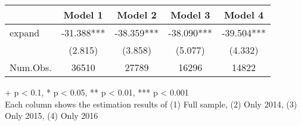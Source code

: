 \setlength{\LTpost}{0mm}
\begin{longtable}{lcccc}
\toprule
  & Model 1 & Model 2 & Model 3 & Model 4 \\ 
\midrule
expand & -31.388*** & -38.359*** & -38.090*** & -39.504*** \\ 
 & (2.815) & (3.858) & (5.077) & (4.332) \\ 
Num.Obs. & 36510 & 27789 & 16296 & 14822 \\ 
\bottomrule
\end{longtable}
\begin{minipage}{\linewidth}
+ p < 0.1, * p < 0.05, ** p < 0.01, *** p < 0.001\\
Each column shows the estimation results of (1) Full sample, (2) Only 2014, (3) Only 2015, (4) Only 2016\\
\end{minipage}

